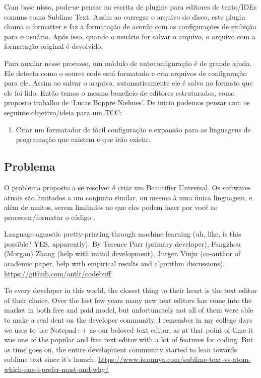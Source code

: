 {    Com base nisso, pode-se pensar na escrita de plugins para editores de texto/IDEs comuns como
    Sublime Text. Assim ao carregar o arquivo do disco, este plugin chama o formatter e faz a
    formatação de acordo com as configurações de exibição para o usuário. Após isso, quando o
    usuário for salvar o arquivo, o arquivo com a formatação original é devolvido.

    Para auxilar nesse processo, um módulo de autoconfiguração é de grande ajuda. Ele detecta como o
    source code está formatado e cria arquivos de configuração para ele. Assim ao salvar o arquivo,
    automaticamente ele é salvo no formato que ele foi lido. Então temos o mesmo beneficio de
    editores estruturados, como proposto trabalho de `Lucas Boppre Niehues'. De inicio podemos
    pensar com os seguinte objetivo/ideia para um TCC:

    \medskip
    \begin{myquote}
    \begin{enumerate}[nolistsep]
        \item Criar um formatador de fácil configuração e expansão para as linguagens de
              programação que existem e que irão existir.
    \end{enumerate}
    \end{myquote}



\subsection{Problema}

    O problema proposto a se resolver é criar um Beautifier Universal. Os softwares atuais são
    limitados a um conjunto similar, ou mesmo à uma única linguagem, e além de muitos, serem
    limitados ao que eles podem fazer por você ao processar/formatar o código \cite{universalCodeFormatter}.

    Language-agnostic pretty-printing through machine learning (uh, like, is this possible? YES, apparently). By Terence Parr (primary developer), Fangzhou (Morgan) Zhang (help with initial development), Jurgen Vinju (co-author of academic paper, help with empirical results and algorithm discussions).
    \url{https://github.com/antlr/codebuff}


    To every developer in this world, the closest thing to their heart is the text editor of their
    choice. Over the last few years many new text editors has come into the market in both free and
    paid model, but unfortunately not all of them were able to make a real dent on the developer
    community. I remember in my college days we uses to use Notepad++ as our beloved text editor, as
    at that point of time it was one of the popular and free text editor with a lot of features for
    coding. But as time goes on, the entire development community started to lean towards sublime
    text since it’s launch.
    \url{https://www.isaumya.com/sublime-text-vs-atom-which-one-i-prefer-most-and-why/}

}
